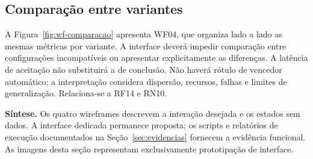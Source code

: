 \subsection{Comparação entre variantes}
A Figura~\ref{fig:wf-comparacao} apresenta WF04, que organiza lado a lado as mesmas métricas por variante. A interface deverá impedir comparação entre configurações incompatíveis ou apresentar explicitamente as diferenças. A latência de aceitação não substituirá a de conclusão. Não haverá rótulo de vencedor automático: a interpretação considera dispersão, recursos, falhas e limites de generalização. Relaciona-se a RF14 e RN10.

\textbf{Síntese.} Os quatro wireframes descrevem a interação desejada e os estados sem dados. A interface dedicada permanece proposta; os scripts e relatórios de execução documentados na Seção~\ref{sec:evidencias} fornecem a evidência funcional. As imagens desta seção representam exclusivamente prototipação de interface.
